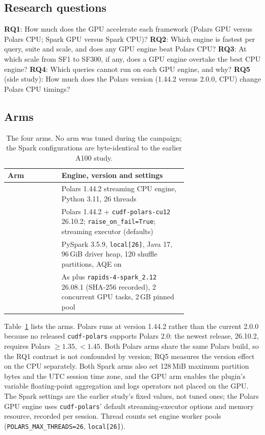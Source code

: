 \documentclass[sigconf, nonacm]{acmart}
\begin{document}
\subsection{Research questions}
\label{sec:rqs}
\textbf{RQ1}: How much does the GPU accelerate each framework (Polars GPU
versus Polars CPU; Spark GPU versus Spark CPU)? \textbf{RQ2}: Which engine is
fastest per query, suite and scale, and does any GPU engine beat Polars CPU?
\textbf{RQ3}: At which scale from SF1 to SF300, if any, does a GPU engine
overtake the best CPU engine? \textbf{RQ4}: Which queries cannot run on each
GPU engine, and why? \textbf{RQ5} (side study): How much does the Polars
version (1.44.2 versus 2.0.0, CPU) change Polars CPU timings?

\subsection{Arms}
\label{sec:arms}

\begin{table}[t]
\centering
\caption{The four arms. No arm was tuned during the campaign; the Spark
configurations are byte-identical to the earlier A100 study.}
\label{tab:arms}
\footnotesize
\setlength{\tabcolsep}{3pt}
\begin{tabular}{@{}lp{0.70\linewidth}@{}}
\toprule
Arm & Engine, version and settings \\
\midrule
\polarscpu{} & Polars 1.44.2 streaming CPU engine, Python 3.11, 26 threads \\
\polarsgpu{} & Polars 1.44.2 + \texttt{cudf-polars-cu12} 26.10.2; \texttt{raise\_on\_fail=True}; streaming executor (defaults) \\
\sparkcpu{}  & PySpark 3.5.9, \texttt{local[26]}, Java 17, 96\,GiB driver heap, 120 shuffle partitions, AQE on \\
\sparkgpu{}  & As \sparkcpu{} plus \texttt{rapids-4-spark\_2.12} 26.08.1 (SHA-256 recorded), 2 concurrent GPU tasks, 2\,GB pinned pool \\
\bottomrule
\end{tabular}
\end{table}

Table~\ref{tab:arms} lists the arms. Polars runs at version 1.44.2 rather than
the current 2.0.0 because no released \texttt{cudf-polars} supports Polars 2.0:
the newest release, 26.10.2, requires Polars ${\ge}1.35,{<}1.45$. Both Polars
arms share the same Polars build, so the RQ1 contrast is not confounded by
version; RQ5 measures the version effect on the CPU separately. Both Spark arms
also set 128\,MiB maximum partition bytes and the UTC session time zone, and
the GPU arm enables the plugin's variable floating-point aggregation and logs
operators not placed on the GPU. The Spark settings are the earlier study's
fixed values, not tuned ones; the Polars GPU
engine uses \texttt{cudf-polars}' default streaming-executor options and memory
resource, recorded per session. Thread counts set engine worker pools
(\texttt{POLARS\_MAX\_THREADS=26}, \texttt{local[26]}).
\end{document}
